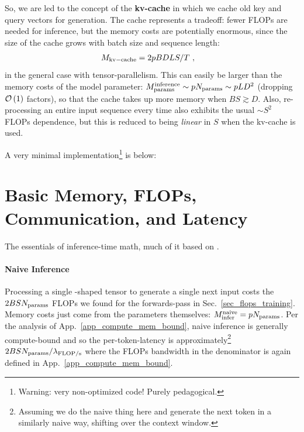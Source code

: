 \documentclass[11pt]{article}
\begin{document}
So, we are led to the concept of the \textbf{kv-cache} in which we cache old key and query vectors for generation.
The cache represents a tradeoff: fewer FLOPs are needed for inference, but the memory costs are potentially
enormous, since the size of the cache grows with batch size and sequence length:
\begin{align}
	M _{ {\rm kv-cache}  } & = 2pBDLS /T\ ,  \label{eq_kv_cache_memory}
\end{align}
in the general case with tensor-parallelism. This can easily be larger than the memory costs of the
model parameter: $ M _{ {\rm params}  } ^{ {\rm  inference}  } \sim p N _{ {\rm params}  } \sim p LD
		^{ 2 }  $ (dropping $ \mathcal{O} \left( 1 \right)  $ factors), so that the cache takes up more memory
when $ BS \gtrsim D $. Also, re-processing an entire input sequence every time also exhibits the
usual $\sim S ^{ 2 }  $ FLOPs dependence, but this is reduced to being \textit{linear} in $ S $
when the kv-cache is used.


A very minimal implementation\footnote{Warning: very non-optimized code! Purely pedagogical.} is below:


\section{Basic Memory, FLOPs, Communication, and Latency}

The essentials of inference-time math, much of it based on \cite{kipply_inference_math}.

\paragraph{Naive Inference} Processing a single -shaped tensor to generate a single
next input costs the $ 2BSN _{ {\rm params}  } $ FLOPs we found for the forwards-pass in
Sec.~\ref{sec_flops_training}. Memory costs just come from the parameters themselves: $ M _{ {\rm
					infer}  }^{ {\rm naive}  }=pN _{ {\rm params}  } $. Per the analysis of App.~\ref{app_compute_mem_bound},
naive inference is generally compute-bound and so the per-token-latency is approximately\footnote{Assuming we
	do the naive thing here and generate the next token in a similarly naive way, shifting over the
	context window.}  $  2BSN _{ {\rm params}  }/ \lambda _{ {\rm FLOP/s}  } $ where the FLOPs bandwidth
in the denominator is again defined in App.~\ref{app_compute_mem_bound}.
\end{document}
